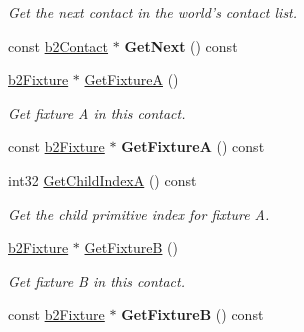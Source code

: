 \begin{DoxyCompactItemize}
\begin{DoxyCompactList}\small\item\em Get the next contact in the world's contact list. \end{DoxyCompactList}\item 
\hypertarget{classb2_contact_a55e20c9e32071f492952dad256552141}{const \hyperlink{classb2_contact}{b2\-Contact} $\ast$ {\bfseries Get\-Next} () const }\label{classb2_contact_a55e20c9e32071f492952dad256552141}

\item 
\hypertarget{classb2_contact_a707a3a5a14c2cdd4c6eb7fc648d76037}{\hyperlink{classb2_fixture}{b2\-Fixture} $\ast$ \hyperlink{classb2_contact_a707a3a5a14c2cdd4c6eb7fc648d76037}{Get\-Fixture\-A} ()}\label{classb2_contact_a707a3a5a14c2cdd4c6eb7fc648d76037}

\begin{DoxyCompactList}\small\item\em Get fixture A in this contact. \end{DoxyCompactList}\item 
\hypertarget{classb2_contact_af5820afc8ebb6d785a47a979b373b004}{const \hyperlink{classb2_fixture}{b2\-Fixture} $\ast$ {\bfseries Get\-Fixture\-A} () const }\label{classb2_contact_af5820afc8ebb6d785a47a979b373b004}

\item 
\hypertarget{classb2_contact_ab0c9c059c776f315ae62abb5c978afcc}{int32 \hyperlink{classb2_contact_ab0c9c059c776f315ae62abb5c978afcc}{Get\-Child\-Index\-A} () const }\label{classb2_contact_ab0c9c059c776f315ae62abb5c978afcc}

\begin{DoxyCompactList}\small\item\em Get the child primitive index for fixture A. \end{DoxyCompactList}\item 
\hypertarget{classb2_contact_a68464fe587d7e6a1f52763e965bb7361}{\hyperlink{classb2_fixture}{b2\-Fixture} $\ast$ \hyperlink{classb2_contact_a68464fe587d7e6a1f52763e965bb7361}{Get\-Fixture\-B} ()}\label{classb2_contact_a68464fe587d7e6a1f52763e965bb7361}

\begin{DoxyCompactList}\small\item\em Get fixture B in this contact. \end{DoxyCompactList}\item 
\hypertarget{classb2_contact_a06db543279afbb51071bf57475bfcc1e}{const \hyperlink{classb2_fixture}{b2\-Fixture} $\ast$ {\bfseries Get\-Fixture\-B} () const }\label{classb2_contact_a06db543279afbb51071bf57475bfcc1e}


\end{DoxyCompactItemize}
